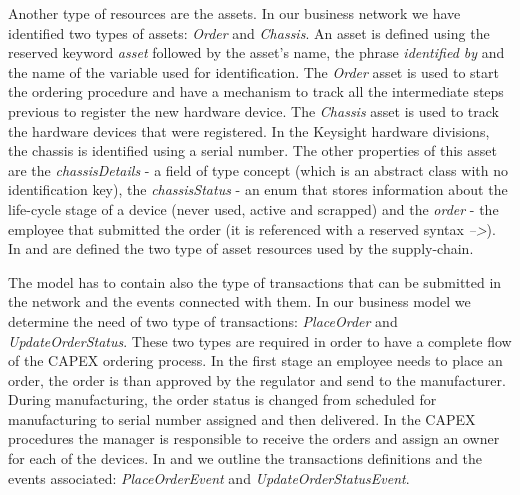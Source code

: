 Another type of resources are the assets. In our business network we have identified two types of assets: \emph{Order} and \emph{Chassis}. 
An asset is defined using the reserved keyword \emph{asset} followed by the asset's name, the phrase \emph{identified by} and the name of the variable used for identification.
The \emph{Order} asset is used
to start the ordering procedure and have a mechanism to track all the intermediate steps previous to register the new hardware device. 
The \emph{Chassis} asset is used to track the hardware devices that were registered. In the Keysight hardware divisions, the chassis is identified using a serial number. The other properties of this asset are the \emph{chassisDetails} - a field of type concept (which is an abstract class with no identification key), the \emph{chassisStatus} - an enum that stores information about the life-cycle stage of a device (never used, active and scrapped) and the \emph{order} - the employee that submitted the order (it is referenced with a reserved syntax \emph{-->}).
In  and  are defined the two type of asset resources used by the supply-chain. 



The model has to contain also the type of transactions that can be submitted in the network and the events connected with them. In our business model we determine the need of two type of transactions: \emph{PlaceOrder} and \emph{UpdateOrderStatus}.
These two types are required in order to have a complete flow of the CAPEX ordering process. In the first stage an employee needs to place an order, the order is than approved by the regulator and send to the manufacturer. During manufacturing, the order status is changed from scheduled for manufacturing to serial number assigned and then delivered. In the CAPEX procedures the manager is responsible to receive the orders and assign an owner for each of the devices. In  and  we outline the transactions definitions and the events associated: \emph{PlaceOrderEvent} and \emph{UpdateOrderStatusEvent}.


